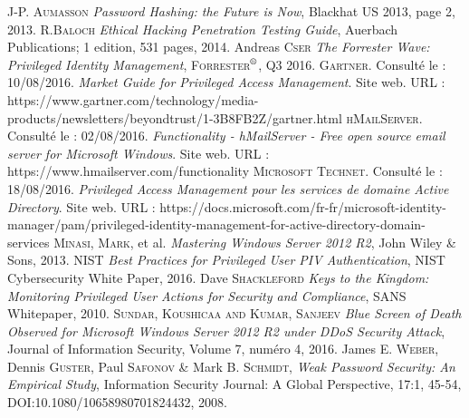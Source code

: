 \begin{thebibliography}{ABC}
	 J-P. \textsc{Aumasson} \emph{Password Hashing: the Future is Now}, Blackhat US 2013, page 2, 2013.
     R.\textsc{Baloch} \emph{Ethical Hacking Penetration Testing Guide}, Auerbach Publications; 1 edition, 531 pages, 2014.
     Andreas \textsc{Cser} \emph{The Forrester Wave\texttrademark: Privileged Identity Management}, \textsc{Forrester$^{\mbox{\scriptsize{\textregistered}}}$}, Q3 2016.
     \textsc{Gartner}. Consulté le : 10/08/2016. \emph{Market Guide for Privileged Access Management}. Site web. \textsc{URL} : https://www.gartner.com/technology/media-products/newsletters/beyondtrust/1-3B8FB2Z/gartner.html
     \textsc{hMailServer}. Consulté le : 02/08/2016. \emph{Functionality - hMailServer - Free open source email server for Microsoft Windows}. Site web. \textsc{URL} : https://www.hmailserver.com/functionality
     \textsc{Microsoft Technet}. Consulté le : 18/08/2016. \emph{Privileged Access Management pour les services de domaine Active Directory}. Site web. \textsc{URL} : https://docs.microsoft.com/fr-fr/microsoft-identity-manager/pam/privileged-identity-management-for-active-directory-domain-services
     \textsc{Minasi}, \textsc{Mark}, et al. \emph{Mastering Windows Server 2012 R2}, John Wiley \& Sons, 2013.
     \textsc{NIST} \emph{Best Practices for Privileged User PIV Authentication}, NIST Cybersecurity White Paper, 2016.
     Dave \textsc{Shackleford} \emph{Keys to the Kingdom: Monitoring Privileged User Actions for Security and Compliance}, SANS Whitepaper, 2010.
     \textsc{Sundar, Koushicaa and Kumar, Sanjeev} \emph{Blue Screen of Death Observed for Microsoft Windows Server 2012 R2 under DDoS Security Attack}, Journal of Information Security, Volume 7, numéro 4, 2016.
     James E. \textsc{Weber}, Dennis \textsc{Guster}, Paul \textsc{Safonov} \& Mark B. \textsc{Schmidt}, \emph{Weak Password Security: An Empirical Study}, Information Security Journal: A Global Perspective, 17:1, 45-54, DOI:10.1080/10658980701824432, 2008.
\end{thebibliography}
